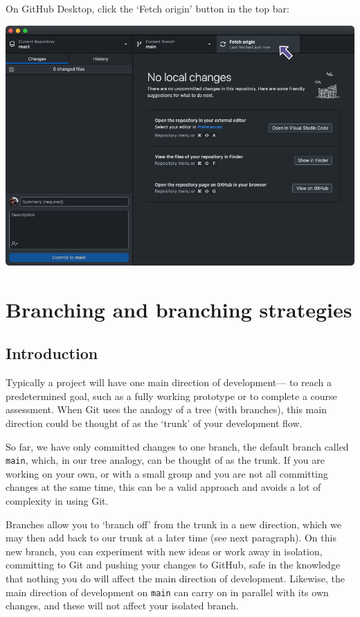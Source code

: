 \documentclass[
  letterpaper,
  DIV=11,
  numbers=noendperiod]{scrartcl}
\begin{document}
On GitHub Desktop, click the `Fetch origin' button in the top bar:

\includegraphics{images/image26.png}

\section{Branching and branching
strategies}\label{branching-and-branching-strategies}

\subsection{Introduction}\label{introduction}

Typically a project will have one main direction of development--- to
reach a predetermined goal, such as a fully working prototype or to
complete a course assessment. When Git uses the analogy of a tree (with
branches), this main direction could be thought of as the `trunk' of
your development flow.

So far, we have only committed changes to one branch, the default branch
called \texttt{main}, which, in our tree analogy, can be thought of as
the trunk. If you are working on your own, or with a small group and you
are not all committing changes at the same time, this can be a valid
approach and avoids a lot of complexity in using Git.

Branches allow you to `branch off' from the trunk in a new direction,
which we may then add back to our trunk at a later time (see next
paragraph). On this new branch, you can experiment with new ideas or
work away in isolation, committing to Git and pushing your changes to
GitHub, safe in the knowledge that nothing you do will affect the main
direction of development. Likewise, the main direction of development on
\texttt{main} can carry on in parallel with its own changes, and these
will not affect your isolated branch.
\end{document}
